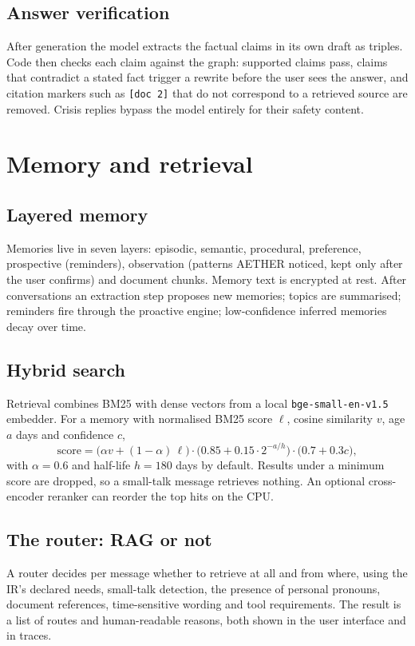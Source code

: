 \documentclass[11pt,a4paper]{article}
\newcommand{\code}[1]{\texttt{#1}}
\begin{document}
\subsection{Answer verification}
After generation the model extracts the factual claims in its own draft as triples. Code then checks each claim against the graph: supported claims pass, claims that contradict a stated fact trigger a rewrite before the user sees the answer, and citation markers such as \code{[doc 2]} that do not correspond to a retrieved source are removed. Crisis replies bypass the model entirely for their safety content.

\section{Memory and retrieval}

\subsection{Layered memory}
Memories live in seven layers: episodic, semantic, procedural, preference, prospective (reminders), observation (patterns AETHER noticed, kept only after the user confirms) and document chunks. Memory text is encrypted at rest. After conversations an extraction step proposes new memories; topics are summarised; reminders fire through the proactive engine; low-confidence inferred memories decay over time.

\subsection{Hybrid search}
Retrieval combines BM25 with dense vectors from a local \code{bge-small-en-v1.5} embedder. For a memory with normalised BM25 score $\ell$, cosine similarity $v$, age $a$ days and confidence $c$,
\[
  \mathrm{score} = \bigl(\alpha v + (1-\alpha)\,\ell\bigr)\cdot\bigl(0.85 + 0.15\cdot 2^{-a/h}\bigr)\cdot\bigl(0.7 + 0.3c\bigr),
\]
with $\alpha = 0.6$ and half-life $h = 180$ days by default. Results under a minimum score are dropped, so a small-talk message retrieves nothing. An optional cross-encoder reranker can reorder the top hits on the CPU.

\subsection{The router: RAG or not}
A router decides per message whether to retrieve at all and from where, using the IR's declared needs, small-talk detection, the presence of personal pronouns, document references, time-sensitive wording and tool requirements. The result is a list of routes and human-readable reasons, both shown in the user interface and in traces.
\end{document}
